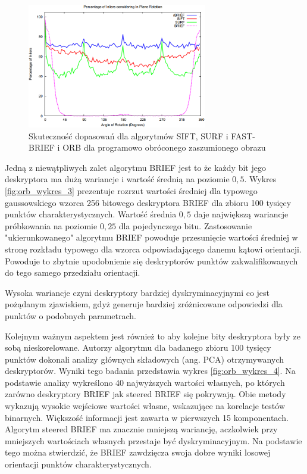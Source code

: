 \begin{figure}
\centering
\includegraphics[width=0.7\textwidth]{pict/02/orb/orb_wykres_7.png}
\caption{Skuteczność dopasowań dla algorytmów SIFT, SURF i FAST-BRIEF i ORB dla programowo obróconego zaszumionego obrazu}
\label{fig:orb_wykres_7}
\end{figure}

Jedną z niewątpliwych zalet algorytmu BRIEF jest to że każdy bit jego deskryptora ma dużą wariancje i wartość średnią na poziomie $0,5$. Wykres \ref{fig:orb_wykres_3} prezentuje rozrzut wartości średniej dla typowego gaussowskiego wzorca 256 bitowego deskryptora BRIEF dla zbioru 100 tysięcy punktów charakterystycznych. Wartość średnia $0,5$ daje największą wariancje próbkowania na poziomie $0,25$ dla pojedynczego bitu. Zastosowanie "ukierunkowanego" algorytmu BRIEF powoduje przesunięcie wartości średniej w stronę rozkładu typowego dla wzorca odpowiadającego danemu kątowi orientacji. Powoduje to zbytnie upodobnienie się deskryptorów punktów zakwalifikowanych do tego samego przedziału orientacji.

Wysoka wariancje czyni deskryptory bardziej dyskryminacyjnymi co jest pożądanym zjawiskiem, gdyż generuje bardziej zróżnicowane odpowiedzi dla punktów o podobnych parametrach. 

Kolejnym ważnym aspektem  jest również to aby kolejne bity deskryptora były ze sobą nieskorelowane. Autorzy algorytmu dla badanego zbioru 100 tysięcy punktów dokonali analizy głównych składowych (ang. PCA) otrzymywanych deskryptorów. Wyniki tego badania przedstawia wykres \ref{fig:orb_wykres_4}. Na podstawie analizy wykreślono 40 najwyższych wartości własnych, po których zarówno deskryptory BRIEF jak steered BRIEF się pokrywają. Obie metody wykazują wysokie wejściowe wartości własne, wskazujące na korelacje testów binarnych. Większość informacji jest zawarta w pierwszych 15 komponentach. Algorytm steered BRIEF ma znacznie mniejszą wariancję, aczkolwiek przy mniejszych wartościach własnych przestaje być dyskryminacyjnym. Na podstawie tego można stwierdzić, że BRIEF zawdzięcza swoja dobre wyniki losowej orientacji punktów charakterystycznych.

